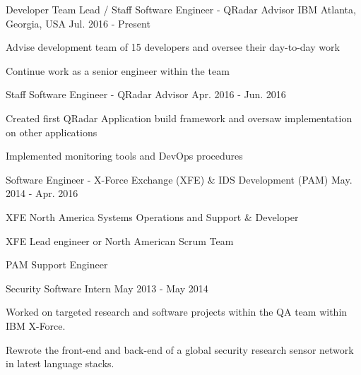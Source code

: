 
\begin{cventries}

  \cventry
    {Developer Team Lead / Staff Software Engineer - QRadar Advisor} %
    {IBM} %
    {Atlanta, Georgia, USA} %
    {Jul. 2016 - Present} %
    {
      \begin{cvitems}
        \item {Advise development team of 15 developers and oversee their day-to-day work}
        \item {Continue work as a senior engineer within the team}
      \end{cvitems}
    }

  \cventry
    {Staff Software Engineer - QRadar Advisor}
    {}
    {}
    {Apr. 2016 - Jun. 2016}
    {
      \begin{cvitems}
        \item {Created first QRadar Application build framework and oversaw implementation on other applications}
        \item {Implemented monitoring tools and DevOps procedures}
      \end{cvitems}
    }

  \cventry
    {Software Engineer - X-Force Exchange (XFE) \& IDS Development (PAM)}
    {}
    {}
    {May. 2014 - Apr. 2016}
    {
    \begin{cvitems}
      \item {XFE North America Systems Operations and Support \& Developer}
      \item {XFE Lead engineer or North American Scrum Team}
      \item {PAM Support Engineer}
    \end{cvitems}
    }

  \cventry
    {Security Software Intern}
    {}
    {}
    {May 2013 - May 2014}
    {
    \begin{cvitems}
      \item {Worked on targeted research and software projects within the QA team within IBM X-Force.}
      \item {Rewrote the front-end and back-end of a global security research sensor network in latest language stacks.}
    \end{cvitems}
    }


\end{cventries}
